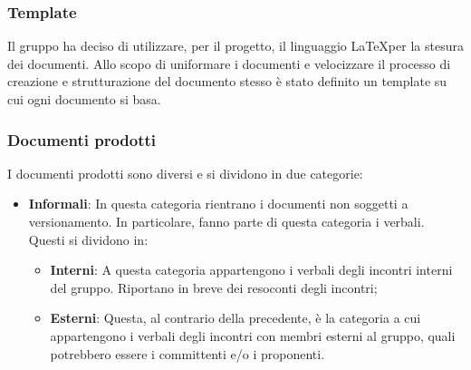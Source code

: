 \documentclass[../norme_di_progetto.tex]{subfiles}
\begin{document}
\subsubsection{Template}
Il gruppo ha deciso di utilizzare, per il progetto, il linguaggio \LaTeX per la stesura dei documenti. Allo scopo di uniformare i documenti e velocizzare il processo di creazione e strutturazione del documento stesso è stato definito un template su cui ogni documento si basa.

\subsubsection{Documenti prodotti}
I documenti prodotti sono diversi e si dividono in due categorie:
\begin{itemize}
    \item \textbf{Informali}: In questa categoria rientrano i documenti non soggetti a versionamento. In particolare, fanno parte di questa categoria i verbali. Questi si dividono in:
    \begin{itemize}
        \item \textbf{Interni}: A questa categoria appartengono i verbali degli incontri interni del gruppo. Riportano in breve dei resoconti degli incontri;
        \item \textbf{Esterni}: Questa, al contrario della precedente, è la categoria a cui appartengono i verbali degli incontri con membri esterni al gruppo, quali potrebbero essere i committenti e/o i proponenti.
    \end{itemize}
    

\end{itemize}
\end{document}
